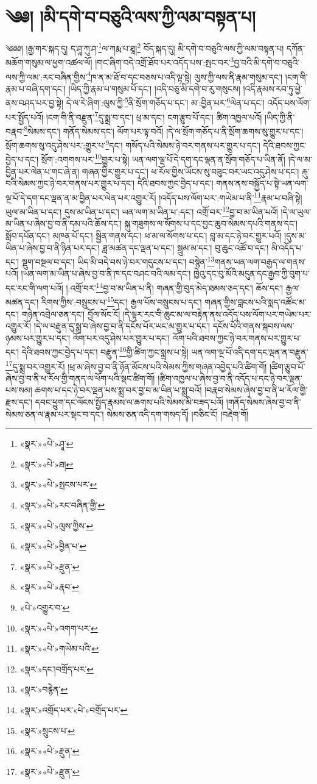 \chapter{༄༅། །མི་དགེ་བ་བཅུའི་ལས་ཀྱི་ལམ་བསྟན་པ།}༄༅༅། །རྒྱ་གར་སྐད་དུ། ད་ཤཱ་ཀུ་ཤ་\footnote{«སྣར་»«པེ་»ཤཱ་}ལ་ཀརྨ་པ་ཐཱ།\footnote{«སྣར་»«པེ་»ཐ།} བོད་སྐད་དུ། མི་དགེ་བ་བཅུའི་ལས་ཀྱི་ལམ་བསྟན་པ། དཀོན་མཆོག་གསུམ་ལ་ཕྱག་འཚལ་ལོ། །གང་ཞིག་བདེ་འགྲོ་ཐོབ་པར་འདོད་པས་:སྤང་བར་\footnote{«སྣར་»«པེ་»སྤངས་པར་}བྱ་བའི་མི་དགེ་བ་བཅུའི་ལས་ཀྱི་ལམ་:རང་བཞིན་གྱིས་\footnote{«སྣར་»«པེ་»རང་བཞིན་གྱི་}ཁ་ན་མ་ཐོ་བ་དང་བཅས་པ་འདི་ལྟ་སྟེ། ལུས་ཀྱི་ལས་ནི་རྣམ་གསུམ་དང་། །ངག་གི་རྣམ་པ་བཞི་དག་དང་། །ཡིད་ཀྱི་རྣམ་པ་གསུམ་པོ་དང་། །འདི་བཅུ་མི་དགེ་བ་རུ་གསུངས། །འདི་རྣམས་རབ་ཏུ་ཕྱེ་ནས་བཤད་པར་བྱ་སྟེ། དེ་ལ་རེ་ཞིག་:ལུས་ཀྱི་\footnote{«སྣར་»«པེ་»ལུས་ཀྱིས་}ནི་སྲོག་གཅོད་པ་དང་། མ་:བྱིན་པར་\footnote{«སྣར་»«པེ་»བྱིན་པ་}ལེན་པ་དང་། འདོད་པས་ལོག་པར་སྤྱོད་པའོ། །ངག་གི་ནི་བརྫུན་\footnote{«སྣར་»«པེ་»རྫུན་}དུ་སྨྲ་བ་དང་། ཕྲ་མ་དང་། ངག་རྩུབ་པོ་དང་། ཚིག་འཁྱལ་པའོ། །ཡིད་ཀྱི་ནི་བརྣབ་\footnote{«སྣར་»«པེ་»རྣབ་}སེམས་དང་། གནོད་སེམས་དང་། ལོག་པར་ལྟ་བའོ། །དེ་ལ་སྲོག་གཅོད་པ་ནི་སྲོག་ཆགས་སུ་གྱུར་པ་དང་། སྲོག་ཆགས་སུ་འདུ་ཤེས་པར་:གྱུར་པ་\footnote{«པེ་»འགྱུར་བ་}དང་། གསོད་པའི་སེམས་ཉེ་བར་གནས་པར་གྱུར་པ་དང་། དེའི་ཐབས་ཀྱང་བྱེད་པ་དང་། སྲོག་:འགགས་པར་\footnote{«སྣར་»«པེ་»འགག་པར་}གྱུར་པ་སྟེ། ཡན་ལག་ལྔ་པོ་དེ་དག་དང་ལྡན་ན་སྲོག་གཅོད་པ་ཡིན་ནོ། །དེ་ལ་མ་བྱིན་པར་ལེན་པ་གང་ཞེ་ན། གཞན་གྱིར་གྱུར་པ་དང་། ཕ་རོལ་གྱིས་ཡོངས་སུ་བཟུང་བར་ཡང་འདུ་ཤེས་པ་དང་། རྐུ་བའི་སེམས་ཀྱང་ཉེ་བར་གནས་པར་གྱུར་པ་དང་། དེའི་ཐབས་ཀྱང་བྱེད་པ་དང་། གནས་ནས་བསྐྱོད་པ་སྟེ་ཡན་ལག་ལྔ་པོ་དེ་དག་དང་ལྡན་ན་མ་བྱིན་པར་ལེན་པར་འགྱུར་རོ། །འདོད་པས་ལོག་པར་:གཡེམ་པ་ནི་\footnote{«སྣར་»«པེ་»གཡེམ་པའི་}རྣམ་པ་བཞི་སྟེ། ཡུལ་མ་ཡིན་པ་དང་། དུས་མ་ཡིན་པ་དང་། ཡན་ལག་མ་ཡིན་པ་:དང་། འགྲོ་བར་\footnote{«སྣར་»དང་།བགྲོད་པར་}བྱ་བ་མ་ཡིན་པའོ། །དེ་ལ་ཡུལ་མ་ཡིན་པ་ཞེས་བྱ་བ་ནི་དམ་པའི་ཆོས་དང་། སྐུ་གཟུགས་ལ་སོགས་པ་དང་བྱང་ཆུབ་སེམས་དཔའི་གནས་དང་། སློབ་དཔོན་དང་། མཁན་པོ་དང་། སྦྱིན་གནས་དང་། ཕ་མ་ལ་སོགས་པ་དང་། བླ་མ་དང་ཉེ་བར་གྱུར་པའོ། །དུས་མ་ཡིན་པ་ཞེས་བྱ་བ་ནི་ཉིན་པར་དང་། ཟླ་མཚན་དང་ལྡན་པ་དང་། སྦྲུམ་མ་དང་། བུ་ཆུང་འཚོ་བ་དང་། མི་འདོད་པ་དང་། སྡུག་བསྔལ་བ་དང་། ཡིད་མི་བདེ་བས་ཉེ་བར་གདུངས་པ་དང་། བསྙེན་\footnote{«སྣར་»བརྙེན་}གནས་ཡན་ལག་བརྒྱད་ལ་གནས་པའོ། །ཡན་ལག་མ་ཡིན་པ་ཞེས་བྱ་བ་ནི་ཁ་དང་བཤང་བའི་ལམ་དང་། ཁྱེའུ་དང་བུ་མོའི་མདུན་དང་རྒྱབ་ཀྱི་བུག་པ་དང་རང་གི་ལག་པའོ། །:འགྲོ་བར་\footnote{«སྣར་»འགྲོད་པར་«པེ་»བགྲོད་པར་}བྱ་བ་མ་ཡིན་པ་ནི། གཞན་གྱི་བུད་མེད་ཐམས་ཅད་དང་། ཆོས་དང་། རྒྱལ་མཚན་དང་། རིགས་ཀྱིས་:བསྲུངས་པ་\footnote{«སྣར་»སྲུངས་པ་}དང་། རྒྱལ་པོས་བསྲུངས་པ་དང་། གཞན་གྱིས་བླངས་པའི་སྨད་འཚོང་མ་དང་། གཉེན་འབྲེལ་ཅན་དང་། བྱོལ་སོང་ངོ། །དེ་ལྟར་རང་གི་ཆུང་མ་ལ་བརྟེན་ནས་འདོད་པས་ལོག་པར་གཡེམ་པར་འགྱུར་རོ། །དེ་ལ་བརྫུན་དུ་སྨྲ་བ་ཞེས་བྱ་བ་ནི་དངོས་པོར་ཡང་མ་གྱུར་པ་དང་། དངོས་པོའི་གནས་སྐབས་ལས་ཉམས་པར་གྱུར་པ་དང་། ལོག་པར་འདུ་ཤེས་པར་གྱུར་པ་དང་། ལོག་པའི་ཐབས་ཀྱང་ཉེ་བར་གནས་པར་གྱུར་པ་དང་། དེའི་ཐབས་ཀྱང་བྱེད་པ་དང་། བརྫུན་\footnote{«སྣར་»«པེ་»རྫུན་}གྱི་ཚིག་ཀྱང་སྨྲས་པ་སྟེ། ཡན་ལག་ལྔ་པོ་འདི་དག་དང་ལྡན་ན་བརྫུན་\footnote{«སྣར་»«པེ་»རྫུན་}དུ་སྨྲ་བར་འགྱུར་རོ། །ཕྲ་མ་ཞེས་བྱ་བ་ནི་ཉོན་མོངས་པའི་སེམས་ཀྱིས་གཞན་འབྱེད་པའི་ཚིག་གོ། །ཚིག་རྩུབ་པོ་ཞེས་བྱ་བ་ནི་ཕ་རོལ་གྱི་གནད་ལ་ཕོག་པའི་སྡང་ཚིག་གོ། །ཚིག་འཁྱལ་པ་ཞེས་བྱ་བ་ནི་འདོད་པ་དང་ཉེ་བར་ལྡན་པས་སམ། ཆགས་པ་དང་ཉེ་བར་ལྡན་པས་སྨྲ་བར་བྱ་བ་མ་ཡིན་པ་སྨྲ་བའོ། །བརྣབ་སེམས་ཞེས་བྱ་བ་ནི་ཕ་རོལ་གྱི་རྫས་དང་། དབང་ཕྱུག་དང་ལོངས་སྤྱོད་རྣམས་ལ་ཆགས་པའི་སེམས་མི་བཟད་པའོ། །གནོད་སེམས་ཞེས་བྱ་བ་ནི་སེམས་ཅན་ལ་རྣམ་པར་སྡང་བ་དང་། སེམས་ཅན་འདི་དག་གསད་དོ། །བཅིང་ངོ། །བརྡེག་གོ། 